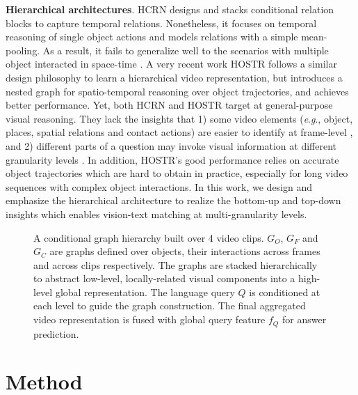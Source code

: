 \documentclass[letterpaper]{article} \usepackage{aaai21}  \usepackage{times}  \usepackage{helvet} \usepackage{courier}  \usepackage[hyphens]{url}  \usepackage{graphicx} \urlstyle{rm} \def\UrlFont{\rm}  \usepackage{natbib}  \usepackage{caption} \usepackage{color, colortbl}
\newcommand{\eg}{\textit{e}.\textit{g}.}
\begin{document}
\textbf{Hierarchical architectures}. HCRN \cite{le2020hierarchical} designs and stacks conditional relation blocks to capture temporal relations. Nonetheless, it focuses on temporal reasoning of single object actions and models relations with a simple mean-pooling. As a result, it fails to generalize well to the scenarios with multiple object interacted in space-time \cite{xiao2021next}. A very recent work HOSTR \cite{dang2021hierarchical} follows a similar design philosophy to learn a hierarchical video representation, but introduces a nested graph for spatio-temporal reasoning over object trajectories, and achieves better performance. Yet, both HCRN and HOSTR
target at general-purpose visual reasoning. They lack the insights that 1) some video elements (\eg, object, places, spatial relations and contact actions) are easier to identify at frame-level \cite{gkioxari2018detecting,xiao2020visual}, and 2) different parts of a question may invoke visual information at different granularity levels \cite{chen2020fine}. In addition, HOSTR's good performance relies on accurate object trajectories which are hard to obtain in practice, especially for long video sequences with complex object interactions. In this work, we design and emphasize the hierarchical architecture to realize the bottom-up and top-down insights which enables vision-text matching at multi-granularity levels.
\begin{figure*}[t]
 \centering
 \caption{A conditional graph hierarchy built over 4 video clips. $G_O$, $G_F$ and $G_C$ are graphs defined over objects, their interactions across frames and across clips respectively. The graphs are stacked hierarchically to abstract low-level, locally-related visual components into a high-level global representation. The language query $Q$ is conditioned at each level to guide the graph construction. The final aggregated video representation is fused with global query feature $f_Q$ for answer prediction.}

 \label{fig:model_arc}
 \vspace{-1.0em}
\end{figure*}

\section{Method}
\end{document}
